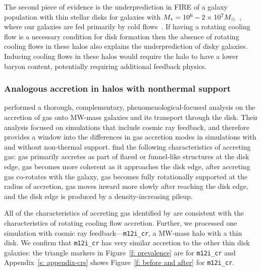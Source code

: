 \documentclass[fleqn,usenatbib]{mnras}
\begin{document}
The second piece of evidence is the underprediction in FIRE of a galaxy population with thin stellar disks for galaxies with $M_* = 10^6 \-- 2 \times 10^7 M_\odot$~\citep{El-Badry2018a}, where our galaxies are fed primarily by cold flows~\citep{Stern2020}.
If having a rotating cooling flow is a necessary condition for disk formation then the absence of rotating cooling flows in these halos also explains the underprediction of disky galaxies.
Inducing cooling flows in these halos would require the halo to have a lower baryon content, potentially requiring additional feedback physics.

\subsubsection{Analogous accretion in halos with nonthermal support}

\cite{Trapp2021} performed a thorough, complementary, phenomenological-focused analysis on the accretion of gas onto MW-mass galaxies and its transport through the disk.
Their analysis focused on simulations that include cosmic ray feedback, and therefore provides a window into the differences in gas accretion modes in simulations with and without non-thermal support.
\citeauthor{Trapp2021} find the following characteristics of accreting gas:
gas primarily accretes as part of flared or funnel-like structures at the disk edge,
gas becomes more coherent as it approaches the disk edge,
after accreting gas co-rotates with the galaxy,
gas becomes fully rotationally supported at the radius of accretion,
gas moves inward more slowly after reaching the disk edge,
and the disk edge is produced by a density-increasing pileup.

All of the characteristics of accreting gas identified by \citeauthor{Trapp2021} are consistent with the characteristics of rotating cooling flow accretion.
Further, we processed one simulation with cosmic ray feedback---\texttt{m12i\_cr}, a MW-mass halo with a thin disk.
We confirm that \texttt{m12i\_cr} has very similar accretion to the other thin disk galaxies:
the triangle markers in Figure~\ref{f: prevalence} are for \texttt{m12i\_cr} and Appendix~\ref{s: appendix-crs} shows Figure~\ref{f: before and after} for \texttt{m12i\_cr}.
\end{document}
